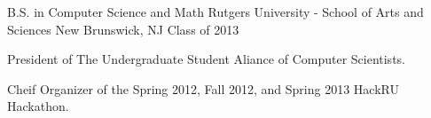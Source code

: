

\begin{cventries}

	\cventry
	{B.S. in Computer Science and Math} %
	{Rutgers University - School of Arts and Sciences} %
	{New Brunswick, NJ} %
	{Class of 2013} %
	{
		\begin{cvitems} %
		\item {President of The Undergraduate Student Aliance of Computer Scientists.}
		\item {Cheif Organizer of the Spring 2012, Fall 2012, and Spring 2013 HackRU Hackathon.}
		\end{cvitems}
	}

\end{cventries}
